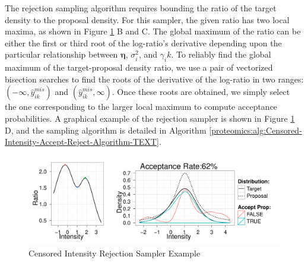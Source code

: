 The rejection sampling algorithm requires bounding the ratio of the target density to the proposal density.
For this sampler, the given ratio has two local maxima, as shown in Figure \ref{proteomics:fig:Censored-Intensity-Rejection-Sampler-Outline-TEXT} B and C.
The global maximum of the ratio can be either the first or third root of the log-ratio's derivative depending upon the particular relationship between $\bm \eta$, $\sigma^2_i$, and $\gamma_ik$.
To reliably find the global maximum of the target-proposal density ratio, we use a pair of vectorized bisection searches to find the roots of the derivative of the log-ratio in two ranges: $(-\infty,\hat{y}_{ik}^{mis})$ and $(\hat{y}_{ik}^{mis},\infty)$.
Once these roots are obtained, we simply select the one corresponding to the larger local maximum to compute acceptance probabilities.
A graphical example of the rejection sampler is shown in Figure \ref{proteomics:fig:Censored-Intensity-Rejection-Sampler-Outline-TEXT} D, and the sampling algorithm is detailed in Algorithm \ref{proteomics:alg:Censored-Intensity-Accept-Reject-Algorithm-TEXT}.

\ifx\nofigures\undefined
\begin{figure}
\includegraphics[width=1\textwidth]{figures/proteomics/figure_ycen_rejection_sampler.pdf}
\caption{Censored Intensity Rejection Sampler Example\label{proteomics:fig:Censored-Intensity-Rejection-Sampler-Outline-TEXT}}
\end{figure}
\fi

